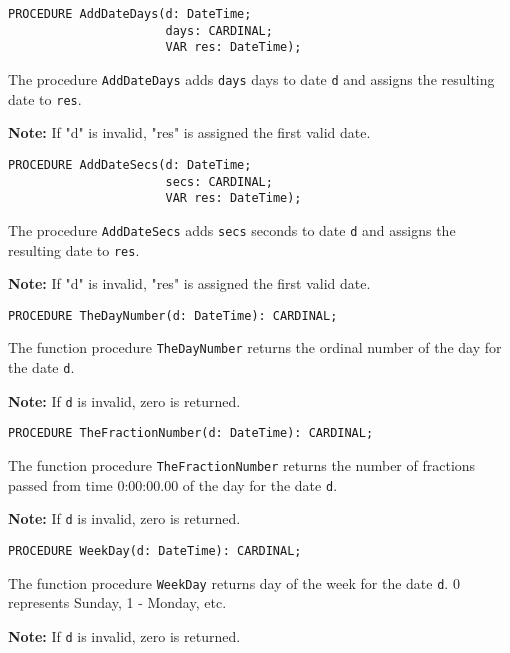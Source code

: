 {\samepage
{}
\begin{verbatim}
PROCEDURE AddDateDays(d: DateTime;
                      days: CARDINAL;
                      VAR res: DateTime);
\end{verbatim}
}
\ModuleList
The procedure \verb'AddDateDays' adds \verb'days' days to date \verb'd'
and assigns the resulting date to \verb'res'.

{\bf Note:} If "d" is invalid, "res" is assigned the first valid date.

{\samepage
{}
\begin{verbatim}
PROCEDURE AddDateSecs(d: DateTime;
                      secs: CARDINAL;
                      VAR res: DateTime);
\end{verbatim}
}
\ModuleList
The procedure \verb'AddDateSecs' adds \verb'secs' seconds to date \verb'd'
and assigns the resulting date to \verb'res'.

{\bf Note:} If "d" is invalid, "res" is assigned the first valid date.

{\samepage
{}
\begin{verbatim}
PROCEDURE TheDayNumber(d: DateTime): CARDINAL;
\end{verbatim}
}
\ModuleList
The function procedure \verb'TheDayNumber' returns the ordinal number of
the day for the date \verb'd'.

{\bf Note:} If \verb'd' is invalid, zero is returned.

{\samepage
{}
\begin{verbatim}
PROCEDURE TheFractionNumber(d: DateTime): CARDINAL;
\end{verbatim}
}
\ModuleList
The function procedure \verb'TheFractionNumber' returns the number
of fractions passed from time 0:00:00.00 of the day for the date
\verb'd'.

{\bf Note:} If \verb'd' is invalid, zero is returned.

{\samepage
{}
\begin{verbatim}
PROCEDURE WeekDay(d: DateTime): CARDINAL;
\end{verbatim}
}
\ModuleList
The function procedure \verb'WeekDay' returns day of the week
for the date \verb'd'. 0 represents Sunday, 1 - Monday, etc.

{\bf Note:} If \verb'd' is invalid, zero is returned.


